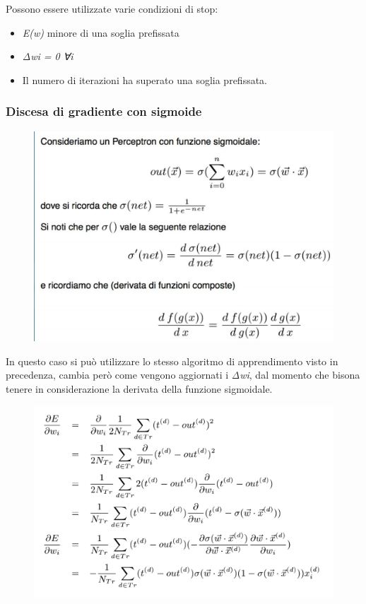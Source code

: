 Possono essere utilizzate varie condizioni di stop:

\begin{itemize}
\tightlist
\item
  \emph{E(w)} minore di una soglia prefissata
\item
  \emph{Δwi = 0 ∀i}
\item
  Il numero di iterazioni ha superato una soglia prefissata.
\end{itemize}

\subsubsection{Discesa di gradiente con
sigmoide}\label{discesa-di-gradiente-con-sigmoide}

\begin{figure}[htbp]
\centering
\includegraphics{./notes/immagini/l10-sigmoidale.png}
\caption{}
\end{figure}

In questo caso si può utilizzare lo stesso algoritmo di apprendimento
visto in precedenza, cambia però come vengono aggiornati i \emph{Δwi},
dal momento che bisona tenere in considerazione la derivata della
funzione sigmoidale.

\begin{figure}[htbp]
\centering
\includegraphics{./notes/immagini/l10-derivata-sigmoide.png}
\caption{}
\end{figure}

